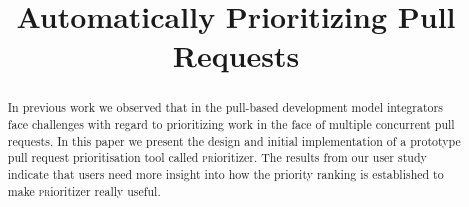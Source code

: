 \documentclass[conference]{IEEEtran}
\begin{document}
\newcommand{\ghtorrent}{\textsc{ght}orrent\xspace}
\newcommand{\prioritizer}{\textsc{pr}ioritizer\xspace}
\newcommand{\api}{\textsc{api}\xspace}
\newcommand{\todo}[1]{\textcolor{red}{\textbf{\textsc{todo:}} #1}}

\newcommand{\nb}[3]{
  \fcolorbox{black}{#2}{\bfseries\sffamily\scriptsize#1}
    {\sf\small$\blacktriangleright$\textit{#3}$\blacktriangleleft$}
}

\newcommand\georgios[1]{\nb{Georgios}{yellow}{#1}}
\newcommand\andy[1]{\nb{Andy}{cyan}{#1}}
\newcommand\erik[1]{\nb{Erik}{magenta}{#1}}

\newcommand{\hassanbox}[1]
{
  \vspace{0.29em}
  \noindent
  \fbox{
  \begin{minipage}{0.46\textwidth}
    \emph{\noindent #1}
    \end{minipage}
}}

\newcommand{\resp}[2]{{\sc R#1:} ``\emph{#2}''}
\newcommand{\respnum}[1]{{\sc R#1}}
\newcommand{\code}[1]{{\textsl{#1}}}

\title{Automatically Prioritizing Pull Requests}

\author{
}


\author{
\and
{}
\and
{}
}

\maketitle

\begin{abstract}
In previous work we observed that in the pull-based development model integrators face challenges with regard to prioritizing work in the face of multiple concurrent pull requests. In this paper we present the design and initial implementation of a prototype pull request prioritisation tool called \prioritizer. The results from our user study indicate that users need more insight into how the priority ranking is established to make \prioritizer really useful.
\end{abstract}
\end{document}
